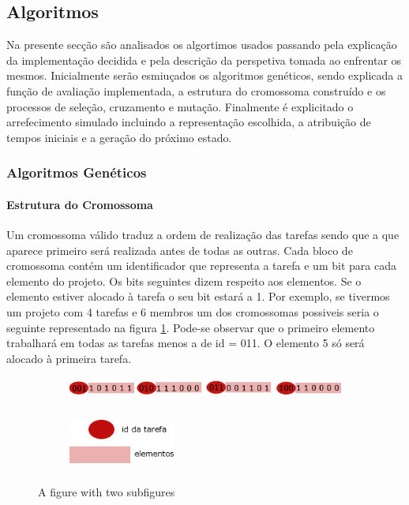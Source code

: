 \begin{titlepage}
\subsection{Algoritmos}
\justify\normalsize

Na presente secção são analisados os algortimos usados passando pela explicação da implementação decidida e pela descrição da perspetiva tomada ao enfrentar os mesmos. Inicialmente serão esmiuçados os algoritmos genéticos, sendo explicada a função de avaliação implementada, a estrutura do cromossoma construído e os processos de seleção, cruzamento e mutação. Finalmente é explicitado o arrefecimento simulado incluindo a representação escolhida, a atribuição de tempos iniciais e a geração do próximo estado. 

\subsubsection{Algoritmos Genéticos}

\paragraph{Estrutura do Cromossoma}
\justify\normalsize
Um cromossoma válido traduz a ordem de realização das tarefas sendo que a que aparece primeiro será realizada antes de todas as outras. Cada bloco de cromossoma contém um identificador que representa a tarefa e um bit para cada elemento do projeto. Os bits seguintes dizem respeito aos elementos. Se o elemento estiver alocado à tarefa o seu bit estará a 1. Por exemplo, se tivermos um projeto com 4 tarefas e 6 membros um dos cromossomas possiveis seria o seguinte representado na figura \ref{fig:sub1}. Pode-se observar que o primeiro elemento trabalhará em todas as tarefas menos a de id = 011. O elemento 5 só será alocado à primeira tarefa.

\begin{figure}[h!]
\centering
\begin{subfigure}{.6\textwidth}
  \centering
  \includegraphics[width=14cm, height = 0.7cm]{chromosome.png}
  \label{fig:sub1}
\end{subfigure}%
\begin{subfigure}{.7\textwidth}
  \centering
  \includegraphics[width=3.5cm, height =1.9cm]{legenda.png}
  \label{fig:sub2}
\end{subfigure}
\caption{A figure with two subfigures}
\label{fig:test}
\end{figure}


\end{titlepage}
